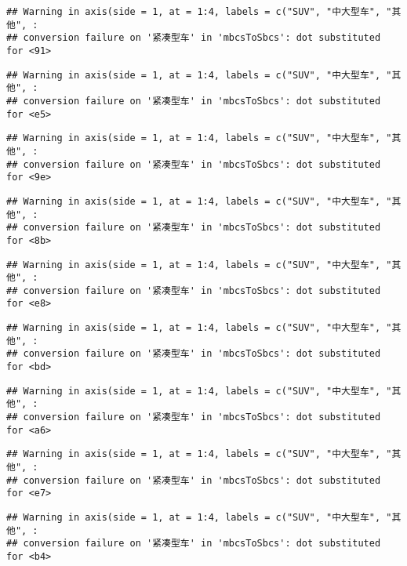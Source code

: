 \documentclass[]{article}
\begin{document}
\begin{verbatim}
## Warning in axis(side = 1, at = 1:4, labels = c("SUV", "中大型车", "其他", :
## conversion failure on '紧凑型车' in 'mbcsToSbcs': dot substituted for <91>
\end{verbatim}

\begin{verbatim}
## Warning in axis(side = 1, at = 1:4, labels = c("SUV", "中大型车", "其他", :
## conversion failure on '紧凑型车' in 'mbcsToSbcs': dot substituted for <e5>
\end{verbatim}

\begin{verbatim}
## Warning in axis(side = 1, at = 1:4, labels = c("SUV", "中大型车", "其他", :
## conversion failure on '紧凑型车' in 'mbcsToSbcs': dot substituted for <9e>
\end{verbatim}

\begin{verbatim}
## Warning in axis(side = 1, at = 1:4, labels = c("SUV", "中大型车", "其他", :
## conversion failure on '紧凑型车' in 'mbcsToSbcs': dot substituted for <8b>
\end{verbatim}

\begin{verbatim}
## Warning in axis(side = 1, at = 1:4, labels = c("SUV", "中大型车", "其他", :
## conversion failure on '紧凑型车' in 'mbcsToSbcs': dot substituted for <e8>
\end{verbatim}

\begin{verbatim}
## Warning in axis(side = 1, at = 1:4, labels = c("SUV", "中大型车", "其他", :
## conversion failure on '紧凑型车' in 'mbcsToSbcs': dot substituted for <bd>
\end{verbatim}

\begin{verbatim}
## Warning in axis(side = 1, at = 1:4, labels = c("SUV", "中大型车", "其他", :
## conversion failure on '紧凑型车' in 'mbcsToSbcs': dot substituted for <a6>
\end{verbatim}

\begin{verbatim}
## Warning in axis(side = 1, at = 1:4, labels = c("SUV", "中大型车", "其他", :
## conversion failure on '紧凑型车' in 'mbcsToSbcs': dot substituted for <e7>
\end{verbatim}

\begin{verbatim}
## Warning in axis(side = 1, at = 1:4, labels = c("SUV", "中大型车", "其他", :
## conversion failure on '紧凑型车' in 'mbcsToSbcs': dot substituted for <b4>
\end{verbatim}
\end{document}
